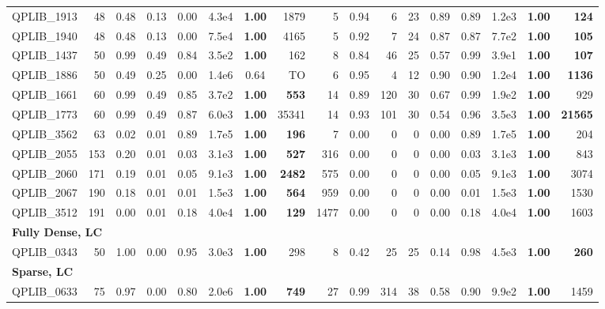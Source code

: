 \documentclass[twoside]{article}
\begin{document}
\begin{table}[h!]
{\begin{tabular}{lrcc|crcr|rcrrccrcr}
				QPLIB\_1913 & 48 & 0.48 & 0.13 & 0.00 & 4.3e4 & \textbf{1.00} & 1879 & 5 & 0.94 & 6 & 23 & 0.89 & 0.89 & 1.2e3 & \textbf{1.00} & \textbf{124} \\
				QPLIB\_1940 & 48 & 0.48 & 0.13 & 0.00 & 7.5e4 & \textbf{1.00} & 4165 & 5 & 0.92 & 7 & 24 & 0.87 & 0.87 & 7.7e2 & \textbf{1.00} & \textbf{105} \\
				QPLIB\_1437 & 50 & 0.99 & 0.49 & 0.84 & 3.5e2 & \textbf{1.00} & 162 & 8 & 0.84 & 46 & 25 & 0.57 & 0.99 & 3.9e1 & \textbf{1.00} & \textbf{107} \\
				QPLIB\_1886 & 50 & 0.49 & 0.25 & 0.00 & 1.4e6 & 0.64 & TO & 6 & 0.95 & 4 & 12 & 0.90 & 0.90 & 1.2e4 & \textbf{1.00} & \textbf{1136} \\
				QPLIB\_1661 & 60 & 0.99 & 0.49 & 0.85 & 3.7e2 & \textbf{1.00} & \textbf{553} & 14 & 0.89 & 120 & 30 & 0.67 & 0.99 & 1.9e2 & \textbf{1.00} & 929 \\
				QPLIB\_1773 & 60 & 0.99 & 0.49 & 0.87 & 6.0e3 & \textbf{1.00} & 35341 & 14 & 0.93 & 101 & 30 & 0.54 & 0.96 & 3.5e3 & \textbf{1.00} & \textbf{21565} \\
				QPLIB\_3562 & 63 & 0.02 & 0.01 & 0.89 & 1.7e5 & \textbf{1.00} & \textbf{196} & 7 & 0.00 & 0 & 0 & 0.00 & 0.89 & 1.7e5 & \textbf{1.00} & 204 \\
				QPLIB\_2055 & 153 & 0.20 & 0.01 & 0.03 & 3.1e3 & \textbf{1.00} & \textbf{527} & 316 & 0.00 & 0 & 0 & 0.00 & 0.03 & 3.1e3 & \textbf{1.00} & 843 \\
				QPLIB\_2060 & 171 & 0.19 & 0.01 & 0.05 & 9.1e3 & \textbf{1.00} & \textbf{2482} & 575 & 0.00 & 0 & 0 & 0.00 & 0.05 & 9.1e3 & \textbf{1.00} & 3074 \\
				QPLIB\_2067 & 190 & 0.18 & 0.01 & 0.01 & 1.5e3 & \textbf{1.00} & \textbf{564} & 959 & 0.00 & 0 & 0 & 0.00 & 0.01 & 1.5e3 & \textbf{1.00} & 1530 \\
				QPLIB\_3512 & 191 & 0.00 & 0.01 & 0.18 & 4.0e4 & \textbf{1.00} & \textbf{129} & 1477 & 0.00 & 0 & 0 & 0.00 & 0.18 & 4.0e4 & \textbf{1.00} & 1603 \\
				\midrule
				\multicolumn{15}{l}{\textbf{Fully Dense, LC}}\\
				\addlinespace[2pt]
				QPLIB\_0343 & 50 & 1.00 & 0.00 & 0.95 & 3.0e3 & \textbf{1.00} & 298 & 8 & 0.42 & 25 & 25 & 0.14 & 0.98 & 4.5e3 & \textbf{1.00} & \textbf{260} \\
				\midrule
				\multicolumn{15}{l}{\textbf{Sparse, LC}}\\
				\addlinespace[2pt]
				QPLIB\_0633 & 75 & 0.97 & 0.00 & 0.80 & 2.0e6 & \textbf{1.00} & \textbf{749} & 27 & 0.99 & 314 & 38 & 0.58 & 0.90 & 9.9e2 & \textbf{1.00} & 1459 \\

\end{tabular}}
\end{table}
\end{document}
